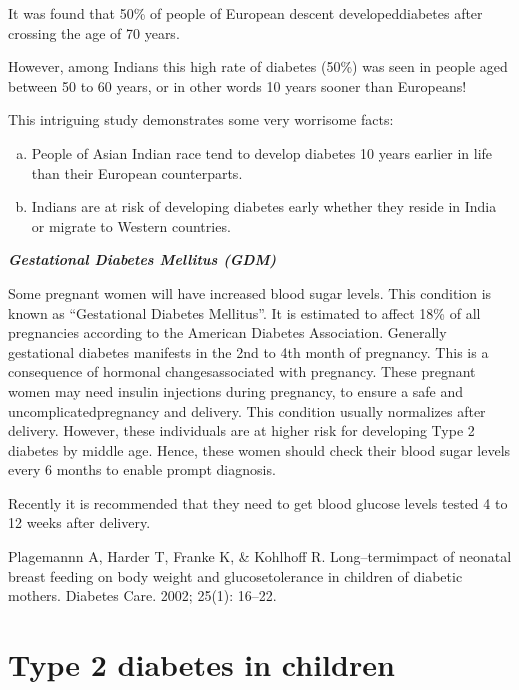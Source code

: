 It was found that 50\% of people of European descent developed\break diabetes after crossing the age of 70 years.

However, among Indians this high rate of diabetes (50\%) was seen in people aged between 50 to 60 years, or in other words 10 years sooner than Europeans!

This intriguing study demonstrates some very worrisome facts:

\begin{enumerate}[a)]
\itemsep=0pt
\item People of Asian Indian race tend to develop diabetes 10 years earlier in life than their European counterparts.
\item Indians are at risk of developing diabetes early whether they reside in India or migrate to Western countries.
\end{enumerate}

\setlength{\parskip}{.2em}
\noindent
\textbf{\textit{Gestational Diabetes Mellitus (GDM)}}

Some pregnant women will have increased blood sugar levels. This condition is known as “Gestational Diabetes Mellitus”. It is estimated to affect 18\% of all pregnancies according to the American Diabetes Association. Generally gestational diabetes manifests in the 2nd to 4th month of pregnancy. This is a consequence of hormonal changes\break associated with pregnancy. These pregnant women may need insulin injections during pregnancy, to ensure a safe and uncomplicated\break pregnancy and delivery. This condition usually normalizes after deli\-very. However, these individuals are at higher risk for developing Type 2 diabetes by middle age. Hence, these women should check their blood sugar levels every 6 months to enable prompt diagnosis.

Recently it is recommended that they need to get blood glucose levels tested 4 to 12 weeks after delivery.

\setlength{\parskip}{.2em}
\begin{thebibliography}{99}
 Plagemannn A, Harder T, Franke K, \& Kohlhoff R. Long–term\break impact of neonatal breast feeding on body weight and glucose\break tolerance in children of diabetic mothers. Diabetes Care. 2002; 25(1): 16–22.
\end{thebibliography}


\chapter{Type 2 diabetes in children}\label{chap7}

